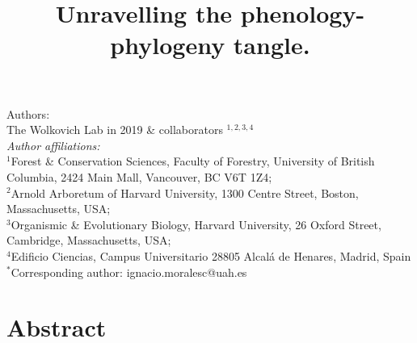 \documentclass{article}\usepackage[]{graphicx}\usepackage[]{color}
\title{Unravelling the phenology-phylogeny tangle.}
\begin{document}
\maketitle

\noindent Authors:\\
The Wolkovich Lab in 2019 \& collaborators $^{1,2,3,4}$ %
\vspace{2ex}\\
\emph{Author affiliations:}\\
$^{1}$Forest \& Conservation Sciences, Faculty of Forestry, University of British Columbia, 2424 Main Mall, Vancouver, BC V6T 1Z4;\\
$^{2}$Arnold Arboretum of Harvard University, 1300 Centre Street, Boston, Massachusetts, USA;\\
$^{3}$Organismic \& Evolutionary Biology, Harvard University, 26 Oxford Street, Cambridge, Massachusetts, USA;\\
$^{4}$Edificio Ciencias, Campus Universitario 28805 Alcalá de Henares, Madrid, Spain\\
 

\vspace{2ex}
$^*$Corresponding author: ignacio.moralesc@uah.es\\
\renewcommand{\thetable}{\arabic{table}}
\renewcommand{\thefigure}{\arabic{figure}}
\renewcommand{\labelitemi}{$-$}

\clearpage

\section*{Abstract}
\end{document}
